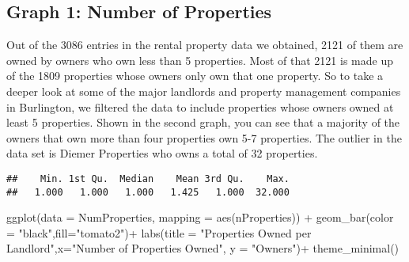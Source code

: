 \documentclass[
]{article}
\newenvironment{Shaded}{\begin{snugshade}}{\end{snugshade}}
\newcommand{\AttributeTok}[1]{\textcolor[rgb]{0.77,0.63,0.00}{#1}}
\newcommand{\FunctionTok}[1]{\textcolor[rgb]{0.00,0.00,0.00}{#1}}
\newcommand{\NormalTok}[1]{#1}
\newcommand{\OtherTok}[1]{\textcolor[rgb]{0.56,0.35,0.01}{#1}}
\newcommand{\SpecialCharTok}[1]{\textcolor[rgb]{0.00,0.00,0.00}{#1}}
\newcommand{\StringTok}[1]{\textcolor[rgb]{0.31,0.60,0.02}{#1}}
\begin{document}
\hypertarget{graph-1-number-of-properties}{%
\subsection{Graph 1: Number of
Properties}\label{graph-1-number-of-properties}}

Out of the 3086 entries in the rental property data we obtained, 2121 of
them are owned by owners who own less than 5 properties. Most of that
2121 is made up of the 1809 properties whose owners only own that one
property. So to take a deeper look at some of the major landlords and
property management companies in Burlington, we filtered the data to
include properties whose owners owned at least 5 properties. Shown in
the second graph, you can see that a majority of the owners that own
more than four properties own 5-7 properties. The outlier in the data
set is Diemer Properties who owns a total of 32 properties.

\begin{Shaded}
\end{Shaded}

\begin{verbatim}
##    Min. 1st Qu.  Median    Mean 3rd Qu.    Max. 
##   1.000   1.000   1.000   1.425   1.000  32.000
\end{verbatim}

\begin{Shaded}
\begin{Highlighting}[]
\FunctionTok{ggplot}\NormalTok{(}\AttributeTok{data =}\NormalTok{ NumProperties, }
       \AttributeTok{mapping =} \FunctionTok{aes}\NormalTok{(nProperties)) }\SpecialCharTok{+} 
        \FunctionTok{geom\_bar}\NormalTok{(}\AttributeTok{color =} \StringTok{"black"}\NormalTok{,}\AttributeTok{fill=}\StringTok{"tomato2"}\NormalTok{)}\SpecialCharTok{+}
        \FunctionTok{labs}\NormalTok{(}\AttributeTok{title =} \StringTok{"Properties Owned per Landlord"}\NormalTok{,}\AttributeTok{x=}\StringTok{"Number of Properties Owned"}\NormalTok{,}
             \AttributeTok{y =} \StringTok{"Owners"}\NormalTok{)}\SpecialCharTok{+}
        \FunctionTok{theme\_minimal}\NormalTok{()}
\end{Highlighting}
\end{Shaded}
\end{document}
